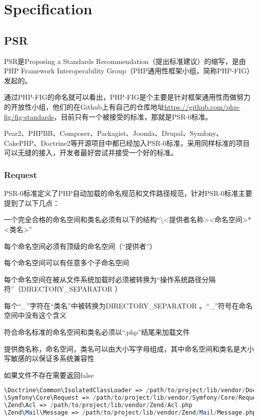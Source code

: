 \part{Specification}



\chapter{PSR}


PSR是Proposing a Standards Recommendation（提出标准建议）的缩写，是由PHP Framework Interoperability Group（PHP通用性框架小组，简称PHP-FIG）发起的。

通过PHP-FIG的命名就可以看出，PHP-FIG是个主要是针对框架通用性而做努力的开放性小组，他们的在Github上有自己的仓库地址\url{https://github.com/php-fig/fig-standards}，目前只有一个被接受的标准，那就是PSR-0标准。

Pear2、PHPBB、Composer、Packagist、Joomla、Drupal、Symfony、CakePHP、Doctrine2等开源项目中都已经加入PSR-0标准，采用同样标准的项目可以无缝的接入，开发者最好尝试并接受一个好的标准。

\section{Request}

PSR-0标准定义了PHP自动加载的命名规范和文件路径规范，针对PSR-0标准主要提到了以下几点：

\begin{compactitem}
\item 一个完全合格的命名空间和类名必须有以下的结构“\textbackslash <提供者名称><命名空间>*<类名>”
\item 每个命名空间必须有顶级的命名空间（“提供者”）
\item 每个命名空间可以有任意多个子命名空间
\item 每个命名空间在被从文件系统加载时必须被转换为“操作系统路径分隔符”（DIRECTORY\_SEPARATOR ）
\item 每个“\_”字符在“类名”中被转换为DIRECTORY\_SEPARATOR 。“\_”符号在命名空间中没有这个含义
\item 符合命名标准的命名空间和类名必须以“.php”结尾来加载文件
\item 提供商名称，命名空间，类名可以由大小写字母组成，其中命名空间和类名是大小写敏感的以保证多系统兼容性
\item 如果文件不存在需要返回false
\end{compactitem}


\begin{lstlisting}[language=PHP]
\Doctrine\Common\IsolatedClassLoader => /path/to/project/lib/vendor/Doctrine/Common/IsolatedClassLoader.php
\Symfony\Core\Request => /path/to/project/lib/vendor/Symfony/Core/Request.php
\Zend\Acl => /path/to/project/lib/vendor/Zend/Acl.php
\Zend\Mail\Message => /path/to/project/lib/vendor/Zend/Mail/Message.php
\end{lstlisting}


